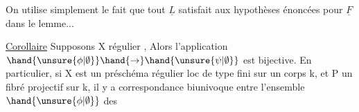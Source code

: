 On utilise simplement le fait que tout $\underline{L}$ satisfait aux 
hypothèses énoncées pour $\underline{F}$ dans le lemme...

\uline{Corollaire}  Supposons  X régulier\hand{)} , Alors l'application $\hand{\unsure{\phi|\emptyset}} \hand{\to} \hand{\unsure{\psi|\emptyset}}$ est bijective. En particulier, si X est
un préschéma régulier loc de type fini sur un corps k, et P un fibré
projectif sur k, il y a correspondance biunivoque entre l'ensemble $\hand{\unsure{\phi|\emptyset}}$ des

